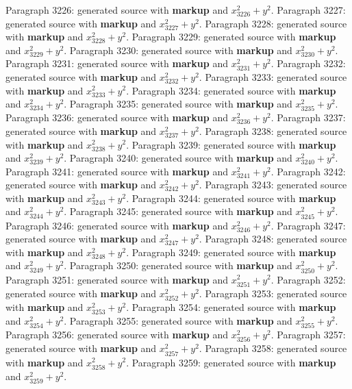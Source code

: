 \documentclass{article}
\begin{document}
Paragraph 3226: generated source with \textbf{markup} and $x_{3226}^2 + y^2$.
Paragraph 3227: generated source with \textbf{markup} and $x_{3227}^2 + y^2$.
Paragraph 3228: generated source with \textbf{markup} and $x_{3228}^2 + y^2$.
Paragraph 3229: generated source with \textbf{markup} and $x_{3229}^2 + y^2$.
Paragraph 3230: generated source with \textbf{markup} and $x_{3230}^2 + y^2$.
Paragraph 3231: generated source with \textbf{markup} and $x_{3231}^2 + y^2$.
Paragraph 3232: generated source with \textbf{markup} and $x_{3232}^2 + y^2$.
Paragraph 3233: generated source with \textbf{markup} and $x_{3233}^2 + y^2$.
Paragraph 3234: generated source with \textbf{markup} and $x_{3234}^2 + y^2$.
Paragraph 3235: generated source with \textbf{markup} and $x_{3235}^2 + y^2$.
Paragraph 3236: generated source with \textbf{markup} and $x_{3236}^2 + y^2$.
Paragraph 3237: generated source with \textbf{markup} and $x_{3237}^2 + y^2$.
Paragraph 3238: generated source with \textbf{markup} and $x_{3238}^2 + y^2$.
Paragraph 3239: generated source with \textbf{markup} and $x_{3239}^2 + y^2$.
Paragraph 3240: generated source with \textbf{markup} and $x_{3240}^2 + y^2$.
Paragraph 3241: generated source with \textbf{markup} and $x_{3241}^2 + y^2$.
Paragraph 3242: generated source with \textbf{markup} and $x_{3242}^2 + y^2$.
Paragraph 3243: generated source with \textbf{markup} and $x_{3243}^2 + y^2$.
Paragraph 3244: generated source with \textbf{markup} and $x_{3244}^2 + y^2$.
Paragraph 3245: generated source with \textbf{markup} and $x_{3245}^2 + y^2$.
Paragraph 3246: generated source with \textbf{markup} and $x_{3246}^2 + y^2$.
Paragraph 3247: generated source with \textbf{markup} and $x_{3247}^2 + y^2$.
Paragraph 3248: generated source with \textbf{markup} and $x_{3248}^2 + y^2$.
Paragraph 3249: generated source with \textbf{markup} and $x_{3249}^2 + y^2$.
Paragraph 3250: generated source with \textbf{markup} and $x_{3250}^2 + y^2$.
Paragraph 3251: generated source with \textbf{markup} and $x_{3251}^2 + y^2$.
Paragraph 3252: generated source with \textbf{markup} and $x_{3252}^2 + y^2$.
Paragraph 3253: generated source with \textbf{markup} and $x_{3253}^2 + y^2$.
Paragraph 3254: generated source with \textbf{markup} and $x_{3254}^2 + y^2$.
Paragraph 3255: generated source with \textbf{markup} and $x_{3255}^2 + y^2$.
Paragraph 3256: generated source with \textbf{markup} and $x_{3256}^2 + y^2$.
Paragraph 3257: generated source with \textbf{markup} and $x_{3257}^2 + y^2$.
Paragraph 3258: generated source with \textbf{markup} and $x_{3258}^2 + y^2$.
Paragraph 3259: generated source with \textbf{markup} and $x_{3259}^2 + y^2$.
\end{document}
